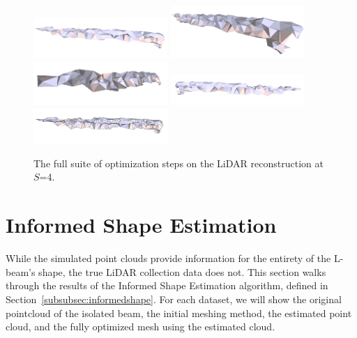 \documentclass[12pt]{drexelthesis}
\let\Oldsection\section
\renewcommand{\section}{\FloatBarrier\Oldsection}
\begin{document}
\begin{figure}[!ht]
	\centering
		\includegraphics[width=2in]{real-lab-scans/meshed/optimized/scalespace4everything00.png}
		\includegraphics[width=2in]{real-lab-scans/meshed/optimized/scalespace4everything01.png}
		\includegraphics[width=2in]{real-lab-scans/meshed/optimized/scalespace4everything02.png}
		\includegraphics[width=2in]{real-lab-scans/meshed/optimized/scalespace4everything03.png}
		\includegraphics[width=2in]{real-lab-scans/meshed/optimized/scalespace4everything04.png}
		\caption[The full suite of optimization steps on the LiDAR reconstruction at $S$=4.]{\centering The full suite of optimization steps on the LiDAR reconstruction at $S$=4.}
	\label{lidar:scalespace4everything}
\end{figure}


\section{Informed Shape Estimation}

While the simulated point clouds provide information for the entirety of the L-beam's shape, the true LiDAR collection data does not. This section walks through the results of the Informed Shape Estimation algorithm, defined in Section~\ref{subsubsec:informedshape}. For each dataset, we will show the original pointcloud of the isolated beam, the initial meshing method, the estimated point cloud, and the fully optimized mesh using the estimated cloud.
\end{document}
